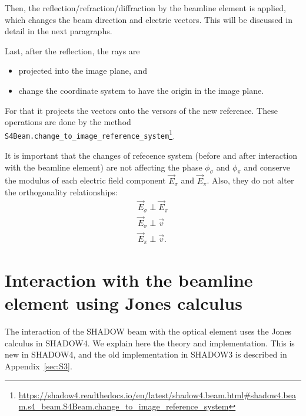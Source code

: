 \documentclass{iucr}
\begin{document}
Then, the reflection/refraction/diffraction by the beamline element is applied, which changes the beam direction and electric vectors.
This will be discussed in detail in the next paragraphs.

Last, after the reflection, the rays are 
\begin{itemize}
    \item projected into the image plane, and
    \item change the coordinate system to have the origin in the image plane.
\end{itemize}
For that it projects the  vectors onto the versors of the new reference. 
These operations are done by the method {\tt S4Beam.change\_to\_image\_reference\_system}\footnote{\tiny \url{https://shadow4.readthedocs.io/en/latest/shadow4.beam.html#shadow4.beam.s4_beam.S4Beam.change_to_image_reference_system}}.

It is important that the changes of refecence system (before and after interaction with the beamline element)  are not affecting the phase $\phi_\sigma$ and $\phi_\pi$ and conserve the modulus of each electric field component $\vec{E}_\sigma$ and $\vec{E}_\pi$. Also, they do not alter the orthogonality relationships:
\begin{eqnarray}
\label{ortho}
\vec{E}_\sigma \perp \vec{E}_\pi \nonumber \\
\vec{E}_\sigma \perp \vec{v} \nonumber \\
\vec{E}_\pi \perp \vec{v}.
\end{eqnarray}


\section{Interaction with the beamline element using Jones calculus}
\label{sec:S4}

The interaction of the SHADOW beam with the optical element  uses the Jones calculus in SHADOW4. We explain here the theory and implementation. This is new in SHADOW4, and the old implementation in SHADOW3 is described in Appendix~\ref{sec:S3}.



\end{document}
